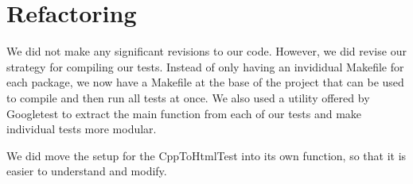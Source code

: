 \section{Refactoring}

We did not make any significant revisions to our code. However, we did revise our strategy for compiling our tests. Instead of only having an invididual Makefile for each package, we now have a Makefile at the base of the project that can be used to compile and then run all tests at once. We also used a utility offered by Googletest to extract the main function from each of our tests and make individual tests more modular.

We did move the setup for the CppToHtmlTest into its own function, so that it is easier to understand and modify.
